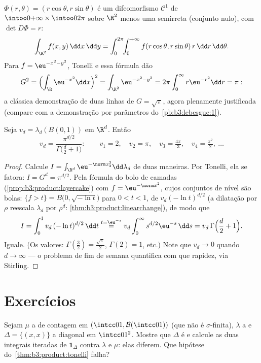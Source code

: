 \begin{example}
\label{ex:b3:product:polar}
$\Phi(r, \theta) = (r\cos\theta, r\sin\theta)$ é um difeomorfismo $\mathcal
C^1$ de $\intoo0{+\infty}\times\intoo0{2\pi}$ sobre $\R^2$ menos uma
semirreta (conjunto nulo), com $\det D\Phi =
r$:
\[
\int_{\R^2}f(x, y)\,\dd x\,\dd y
= \int_0^{2\pi}\!\!\int_0^{+\infty}
f(r\cos\theta, r\sin\theta)\,r\,\dd r\,\dd\theta .
\]
Para $f = \eu^{-x^2-y^2}$, Tonelli e essa fórmula dão
\[
G^2 = \Bigl(\int_\R \eu^{-x^2}\dd x\Bigr)^2
= \int_{\R^2}\eu^{-x^2-y^2}
= 2\pi\int_0^\infty r\eu^{-r^2}\dd r = \pi:
\]
a clássica demonstração de duas linhas de $G = \sqrt\pi$, agora plenamente
justificada (compare com a demonstração por parâmetros
do~\cref{pb:b3:lebesgue:1}).
\end{example}

\begin{theorem}
\label{thm:b3:product:ballvolume}
Seja $v_d = \lambda_d(B(0,1))$ em $\R^d$. Então
\[
v_d = \frac{\pi^{d/2}}{\Gamma\bigl(\frac d2 + 1\bigr)} :
\qquad
v_1 = 2,\quad v_2 = \pi,\quad v_3 = \tfrac{4\pi}3,\quad
v_4 = \tfrac{\pi^2}2,\ \dots
\]
\end{theorem}

\begin{proof}
Calcule $I = \int_{\R^d}\eu^{-\norm x_2^2}\dd\lambda_d$ de duas maneiras. Por Tonelli, ela se fatora: $I = G^d = \pi^{d/2}$. Pela
fórmula do bolo de camadas (\cref{prop:b3:product:layercake}) com $f = \eu^{-
\norm x^2}$, cujos conjuntos
de nível são bolas: $\{f > t\} =
B\bigl(0, \sqrt{-\ln t}\bigr)$ para $0 < t < 1$, de  $v_d(-\ln t)^{d/2}$ (a dilatação por
$\rho$ reescala $\lambda_d$ por $\rho^d$: \cref{thm:b3:product:linearchange}), de modo que
\[
I = \int_0^1 v_d\,(-\ln t)^{d/2}\,\dd t
\overset{t = \eu^{-s}}{=}
v_d\int_0^\infty s^{d/2}\eu^{-s}\,\dd s
= v_d\,\Gamma\Bigl(\frac d2 + 1\Bigr).
\]
Iguale. (Os valores: $\Gamma(\frac32) = \frac{\sqrt\pi}2$, $\Gamma(2) = 1$, etc.) Note que $v_d \to 0$ quando $d \to \infty$ ---
o problema de fim de semana quantifica com que rapidez, via Stirling.
\end{proof}

\section{Exercícios}

\begin{exercise}[$\star$]\label{exo:b3:product:1}
Sejam $\mu$ a  de contagem em $(\intcc01, \mathcal
B(\intcc01))$ (que não é
$\sigma$-finita), $\lambda$ a  e $\Delta = \{(x,x)\}$ a diagonal em
$\intcc01^2$. Mostre que $\Delta$ é  e calcule as duas integrais
iteradas de $\mathbf 1_\Delta$ contra $\lambda$ e $\mu$: elas diferem. Que hipótese
do~\cref{thm:b3:product:tonelli} falha?
\end{exercise}

